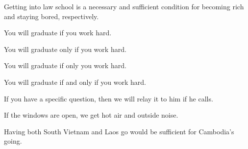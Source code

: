 \begin{enumerate}
\begin{statement}{Getting into law school is a necessary and sufficient condition for becoming rich and staying bored, respectively.}
\end{statement}

\begin{statement}{You will graduate if you work hard.}
\end{statement}

\begin{statement}{You will graduate only if you work hard.}
\end{statement}

\begin{statement}{You will graduate if only you work hard.}
\end{statement}

\begin{statement}{You will graduate if and only if you work hard.}
\end{statement}

\begin{statement}{If you have a specific question, then we will relay it to him if he calls.}
\end{statement}

\begin{statement}{If the windows are open, we get hot air and outside noise.}
\end{statement}

\begin{statement}{Having both South Vietnam and Laos go would be sufficient for Cambodia’s going.}
\end{statement}


\end{enumerate}

